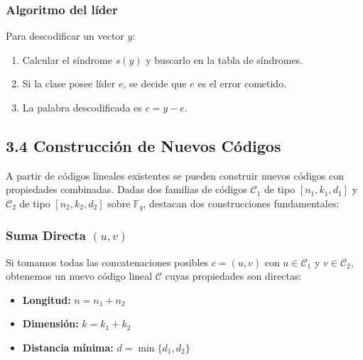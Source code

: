 \documentclass{article}
\begin{document}
\subsubsection{Algoritmo del líder}
Para descodificar un vector $y$:
\begin{enumerate}
\item Calcular el síndrome $s(y)$ y buscarlo en la tabla de síndromes.
\item Si la clase posee líder $e$, se decide que $e$ es el error cometido.
\item La palabra descodificada es $c = y - e$.
\end{enumerate}

\subsection{3.4 Construcción de Nuevos Códigos}
A partir de códigos lineales existentes se pueden construir nuevos códigos con propiedades combinadas. Dadas dos familias de códigos $\mathcal{C}_1$ de tipo $[n_1, k_1, d_1]$ y $\mathcal{C}_2$ de tipo $[n_2, k_2, d_2]$ sobre $\mathbb{F}_q$, destacan dos construcciones fundamentales:

\subsubsection{Suma Directa $(u, v)$}
Si tomamos todas las concatenaciones posibles $c = (u, v)$ con $u \in \mathcal{C}_1$ y $v \in \mathcal{C}_2$, obtenemos un nuevo código lineal $\mathcal{C}$ cuyas propiedades son directas:
\begin{itemize}
    \item \textbf{Longitud:} $n = n_1 + n_2$
    \item \textbf{Dimensión:} $k = k_1 + k_2$
    \item \textbf{Distancia mínima:} $d = \min\{d_1, d_2\}$
\end{itemize}
\end{document}
